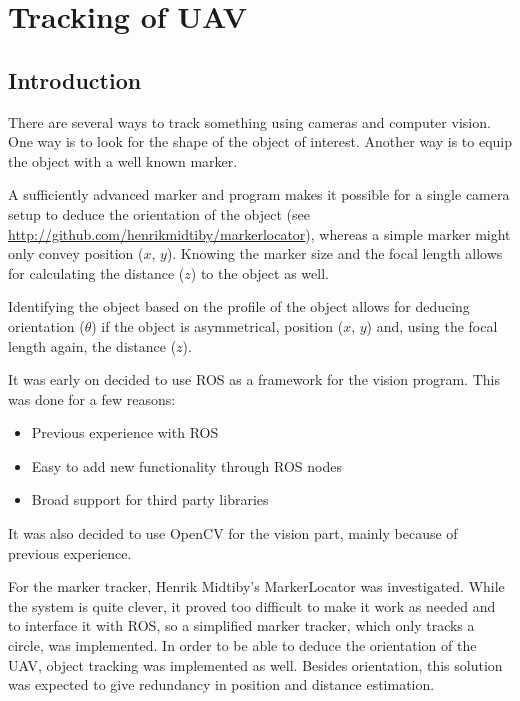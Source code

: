\section{Tracking of UAV}
\subsection{Introduction}
There are several ways to track something using cameras and computer vision. One way is to look for the shape of the object of interest. Another way is to equip the object with a well known marker. 

A sufficiently advanced marker and program makes it possible for a single camera setup to deduce the orientation of the object (see \url{http://github.com/henrikmidtiby/markerlocator}), whereas a simple marker might only convey position ($x$, $y$). Knowing the marker size and the focal length allows for calculating the distance ($z$) to the object as well.

Identifying the object based on the profile of the object allows for deducing orientation ($\theta$) if the object is asymmetrical, position ($x$, $y$) and, using the focal length again, the distance ($z$). 

It was early on decided to use ROS as a framework for the vision program. This was done for a few reasons:
\begin{itemize}
	\item Previous experience with ROS
	\item Easy to add new functionality through ROS nodes
	\item Broad support for third party libraries
\end{itemize}

It was also decided to use OpenCV for the vision part, mainly because of previous experience. 

For the marker tracker, Henrik Midtiby’s MarkerLocator was investigated. While the system is quite clever, it proved too difficult to make it work as needed and to interface it with ROS, so a simplified marker tracker, which only tracks a circle, was implemented. In order to be able to deduce the orientation of the UAV, object tracking was implemented as well. Besides orientation, this solution was expected to give redundancy in position and distance estimation.
